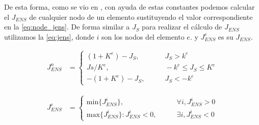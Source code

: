 De esta forma, como se vio en \cite{daines2018repairing}, con ayuda de estas constantes podemos calcular el $J_{ENS}$ de cualquier nodo de un elemento sustituyendo el valor correspondiente en la \autoref{eq:node_jens}. De forma similar a $J_S$ para realizar el cálculo de $J_{ENS}$ utilizamos la \autoref{eq:jens}, donde $i$ son los nodos del elemento $e$. y $J^e_{ENS}$ es su $J_{ENS}$.

\begin{equation} \label{eq:node_jens}
    \begin{aligned}
J^n_{ENS} &=    
\left\{
\begin{array}{rl}
     ( 1 + K^e ) - J_S, & \qquad J_S > k^e
  \\ Js/K^e, & \qquad -k^e \leq J_S \leq K^e
  \\ -( 1 + K^e ) - J_S, & \qquad J_S < -k^e
\end{array}
\right.
    \end{aligned}
\end{equation}


\begin{equation} \label{eq:jens}
    \begin{aligned}
J^e_{ENS} &=    
\left\{
\begin{array}{ll}
     \text{min}\{J^i_{ENS}\}, & \qquad \forall i, J^i_{ENS} > 0
  \\ \text{max}\{J^i_{ENS}\} : J^i_{ENS} < 0, & \qquad \exists i, J^i_{ENS} < 0
\end{array}
\right.
    \end{aligned}
\end{equation}




